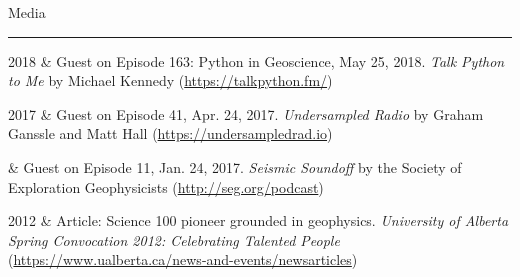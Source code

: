 \documentclass[a4paper, 11pt]{article}
\newcommand{\heading}[1]{
\begin{samepage}
    \vspace{0.5cm}
    {%
    \LARGE
    #1}\\
    \vspace{-0.2cm}
    \hrule
    \vspace{0.2cm}
\end{samepage}
}
\begin{document}
\heading{Media}

\begin{entryright}
2018 & Guest on Episode 163: Python in Geoscience, May 25, 2018. \emph{Talk Python to Me} by Michael Kennedy (\href{https://talkpython.fm/episodes/show/163/python-in-geoscience}{https://talkpython.fm/})
\end{entryright}

\begin{entryright}
2017 & Guest on Episode 41, Apr. 24, 2017. \emph{Undersampled Radio} by Graham Ganssle and Matt Hall (\href{https://undersampledrad.io/home/2017/4/inverterizer}{https://undersampledrad.io})
\end{entryright}

\begin{entryright}
 & Guest on Episode 11, Jan. 24, 2017. \emph{Seismic Soundoff} by the Society of Exploration Geophysicists (\href{http://seg.org/podcast/Post/4610/Episode-11-Geophysical-Electromagnetics-2017-DISC}{http://seg.org/podcast})
\end{entryright}

\begin{entryright}
2012 & Article: Science 100 pioneer grounded in geophysics. \emph{University of Alberta Spring Convocation 2012: Celebrating Talented People} (\href{https://www.ualberta.ca/news-and-events/newsarticles/2012/06/science100pioneergroundedingeophysics}{https://www.ualberta.ca/news-and-events/newsarticles})
\end{entryright}
\end{document}
